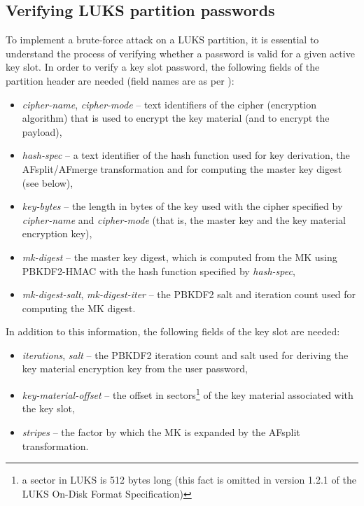 \documentclass[12pt,oneside]{fithesis2}
\begin{document}
      \subsection{Verifying LUKS partition passwords}
      To implement a brute-force attack on a LUKS partition, it is essential to understand the process of verifying whether a password is valid for a given active key slot. In order to verify a key slot password, the following fields of the partition header are needed (field names are as per \cite{luks}):
      \begin{itemize}
        \item \emph{cipher-name}, \emph{cipher-mode} -- text identifiers of the cipher (encryption algorithm) that is used to encrypt the key material (and to encrypt the payload),
        \item \emph{hash-spec} -- a text identifier of the hash function used for key derivation, the AFsplit/AFmerge transformation and for computing the master key digest (see below),
        \item \emph{key-bytes} -- the length in bytes of the key used with the cipher specified by \emph{cipher-name} and \emph{cipher-mode} (that is, the master key and the key material encryption key),
        \item \emph{mk-digest} -- the master key digest, which is computed from the MK using PBKDF2-HMAC with the hash function specified by \emph{hash-spec},
        \item \emph{mk-digest-salt}, \emph{mk-digest-iter} -- the PBKDF2 salt and iteration count used for computing the MK digest.
      \end{itemize}
      
      In addition to this information, the following fields of the key slot are needed:
      \begin{itemize}
        \item \emph{iterations}, \emph{salt} -- the PBKDF2 iteration count and salt used for deriving the key material encryption key from the user password,
        \item \emph{key-material-offset} -- the offset in sectors\footnote{a sector in LUKS is 512 bytes long (this fact is omitted in version 1.2.1 of the LUKS On-Disk Format Specification)} of the key material associated with the key slot,
        \item \emph{stripes} -- the factor by which the MK is expanded by the AFsplit transformation.
      \end{itemize}
      
\end{document}

